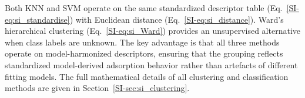 \documentclass[journal=jacsat,manuscript=article]{achemso}
\begin{document}
	Both KNN and SVM operate on the same standardized descriptor table (Eq.~\ref{SI-eq:si_standardise}) with Euclidean distance (Eq.~\ref{SI-eq:si_distance}). Ward's hierarchical clustering (Eq.~\ref{SI-eq:si_Ward}) provides an unsupervised alternative when class labels are unknown. The key advantage is that all three methods operate on model-harmonized descriptors, ensuring that the grouping reflects standardized model-derived adsorption behavior rather than artefacts of different fitting models. The full mathematical details of all clustering and classification methods are given in Section~\ref{SI-sec:si_clustering}.

\end{document}
